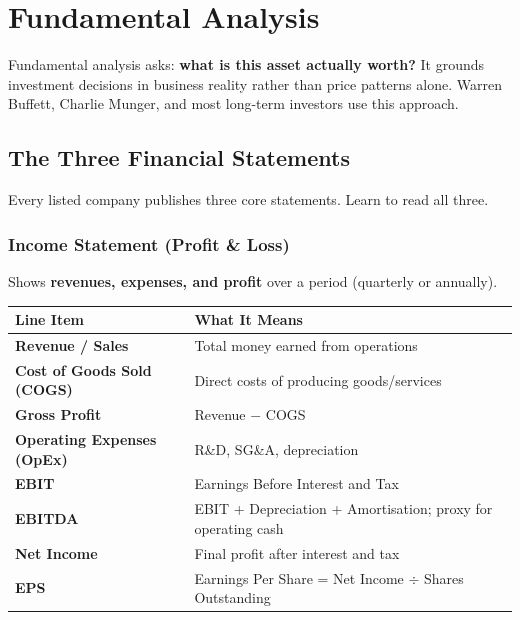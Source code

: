 
\chapter{Fundamental Analysis}

\begin{notebox}
Fundamental analysis asks: \textbf{what is this asset actually worth?}
It grounds investment decisions in business reality rather than price patterns alone.
Warren Buffett, Charlie Munger, and most long-term investors use this approach.
\end{notebox}

\section{The Three Financial Statements}

Every listed company publishes three core statements. Learn to read all three.

\subsection{Income Statement (Profit \& Loss)}
Shows \textbf{revenues, expenses, and profit} over a period (quarterly or annually).

\begin{center}
\begin{tabular}{>{\bfseries}p{5cm} p{7.5cm}}
\toprule
Line Item & What It Means \\
\midrule
Revenue / Sales & Total money earned from operations \\
Cost of Goods Sold (COGS) & Direct costs of producing goods/services \\
Gross Profit & Revenue $-$ COGS \\
Operating Expenses (OpEx) & R\&D, SG\&A, depreciation \\
EBIT & Earnings Before Interest and Tax \\
EBITDA & EBIT + Depreciation + Amortisation; proxy for operating cash \\
Net Income & Final profit after interest and tax \\
EPS & Earnings Per Share = Net Income $\div$ Shares Outstanding \\
\bottomrule
\end{tabular}
\end{center}

